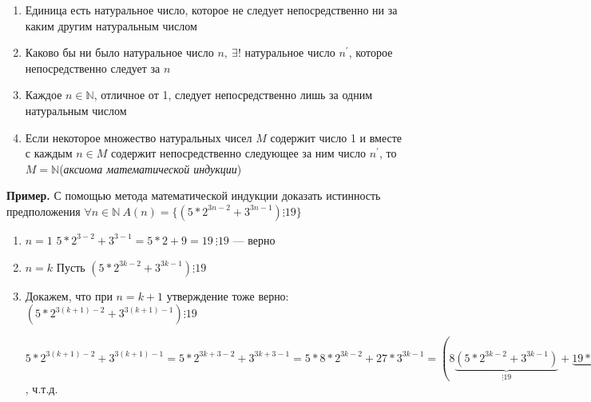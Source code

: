 \documentclass{article}
\begin{document}
    \begin{enumerate}
        \item Единица есть натуральное число, которое не следует непосредственно ни за каким другим натуральным числом
        \item Каково бы ни было натуральное число \(n,\ \exists!\) натуральное число \(n^\prime\), которое непосредственно следует за \(n\)
        \item Каждое \(n \in \mathbb{N}\), отличное от 1, следует непосредственно лишь за одним натуральным числом
        \item Если некоторое множество натуральных чисел \(M\) содержит число 1 и вместе с каждым \(n \in M\) содержит непосредственно следующее за ним число \(n^\prime\), то \(M = \mathbb{N}\)(\textit{аксиома математической индукции})
    \end{enumerate}

    \textbf{Пример.} С помощью метода математической индукции доказать истинность предположения \(\forall n \in \mathbb{N}\ A(n) = \{(5*2^{3n-2} + 3^{3n-1}) \vdots 19\}\)
    \begin{enumerate}
        \item \(n=1\) \quad \(5*2^{3-2} + 3^{3-1} = 5*2 + 9 = 19\ \vdots 19\) --- верно
        \item \(n=k\) \quad Пусть \((5*2^{3k-2} + 3^{3k-1}) \vdots 19\)
        \item Докажем, что при \(n = k+1\) утверждение тоже верно: \((5 * 2^{3(k+1)-2} + 3^{3(k+1)-1}) \vdots 19\)
        
        \(5 * 2^{3(k+1)-2} + 3^{3(k+1)-1} = 5 * 2^{3k+3-2} + 3^{3k+3-1} = 5 * 8 * 2^{3k-2} + 27 * 3^{3k-1} = (8 \underset{\vdots 19}{\underbrace{(5*2^{3k-2} + 3^{3k-1})}} + \underset{\vdots 19}{\underbrace{19 * 3^{3k-1}}})\ \vdots 19\), ч.т.д.
    \end{enumerate}
    
\end{document}
